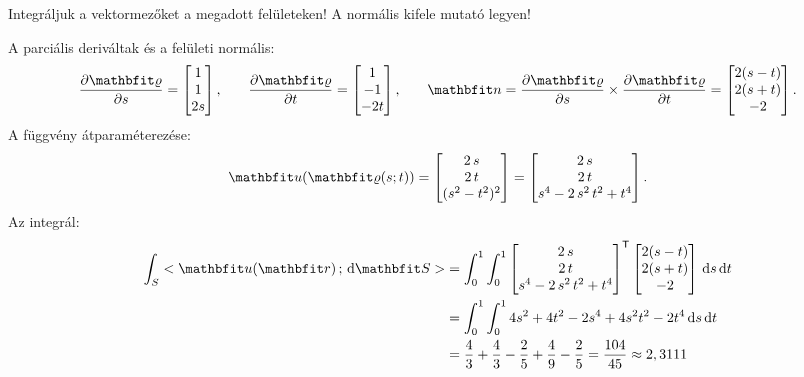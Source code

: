 \documentclass[exercise]{math-standalone}
\begin{document}
\begin{exercise}{%
    Integráljuk a vektormezőket a megadott felületeken!
    A normális kifele mutató legyen!
  }
{\begin{enumerate}[a)]
            A parciális deriváltak és a felületi normális:
            \[
              \pdv{\surfv}{s}
              =
              \begin{bmatrix}
                1 \\ 1 \\ 2s
              \end{bmatrix}
              \text,
              \qquad
              \pdv{\surfv}{t}
              =
              \begin{bmatrix}
                1 \\ -1\\ -2t
              \end{bmatrix}
              \text,
              \qquad
              \rvec n
              =
              \pdv{\surfv}{s} \times \pdv{\surfv}{t}
              =
              \begin{bmatrix}
                2(s - t) \\ 2(s + t) \\ - 2
              \end{bmatrix}
              \text.
            \]
            A függvény átparaméterezése:
            \[
              \rvec u (\surfv (s;t))
              =
              \begin{bmatrix}
                2\,s \\ 2\,t \\ (s^2 - t^2)^2
              \end{bmatrix}
              =
              \begin{bmatrix}
                2\,s \\ 2\,t \\ s^4 - 2\,s^2\,t^2 + t^4
              \end{bmatrix}
              \text.
            \]
            Az integrál:
            \begin{align*}
              \int_S \scalar{\rvec u(\coordv)}{\diff \rvec S}
               & =
              \int_0^1\int_0^1
              \begin{bmatrix}
                2\,s \\ 2\,t \\ s^4 - 2\,s^2\,t^2 + t^4
              \end{bmatrix}^\transpose
              \begin{bmatrix}
                2 (s - t) \\ 2 (s + t) \\ -2
              \end{bmatrix}
              \,\diff s \,\diff t
              \\
               & =
              \int_0^1\int_0^1
              4 s^2  + 4 t^2  - 2 s^4 + 4 s^2 t^2 - 2 t^4
              \,\diff s \,\diff t
              \\
               & =
              \frac43 + \frac43 - \frac25 + \frac49 - \frac25
              =
              \frac{104}{45}
              \approx
              2,3111
            \end{align*}


\end{enumerate}}
\end{exercise}
\end{document}
